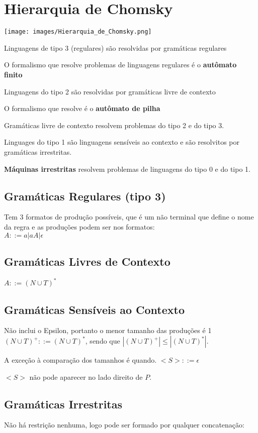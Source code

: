 \documentclass[]{article}
\begin{document}
	\section{Hierarquia de Chomsky}
	\texttt{[image: images/Hierarquia\_de\_Chomsky.png]}
	
	Linguagens de tipo 3 (regulares) são resolvidas por gramáticas regulares
	
	O formalismo que resolve problemas de linguagens regulares é o \textbf{autômato finito}
	
	Linguagens do tipo 2 são resolvidas por gramáticas livre de contexto
	
	O formalismo que resolve é o \textbf{autômato de pilha}
	
	Gramáticas livre de contexto resolvem problemas do tipo 2 e do tipo 3.
	
	Linguages do tipo 1 são linguagens sensíveis ao contexto e são resolvitos por gramáticas irrestritas.
	
	\textbf{Máquinas irrestritas} resolvem problemas de linguagens do tipo 0 e do tipo 1.
	
	\subsection{Gramáticas Regulares (tipo 3)}
		Tem 3 formatos de produção possíveis, que é um não terminal que define o nome da regra e as produções podem ser nos formatos:\\
		$A::= a | aA| \epsilon$
	\subsection{Gramáticas Livres de Contexto}
		$A::=(N\cup T)^*$
	\subsection{Gramáticas Sensíveis ao Contexto}
		Não inclui o Epsilon, portanto o menor tamanho das produções é 1\\
		$ (N \cup T)^{+}::= (N \cup T)^*$, sendo que $ |(N \cup T)^{+}| \leq |(N \cup T)^*|$.
		
		A exceção à comparação dos tamanhos é quando. $<S> ::= \epsilon$

		
		$<S>$ não pode aparecer no lado direito de $P$.
		
	\subsection{Gramáticas Irrestritas}
		Não há restrição nenhuma, logo pode ser formado por qualquer concatenação:
		
\end{document}

